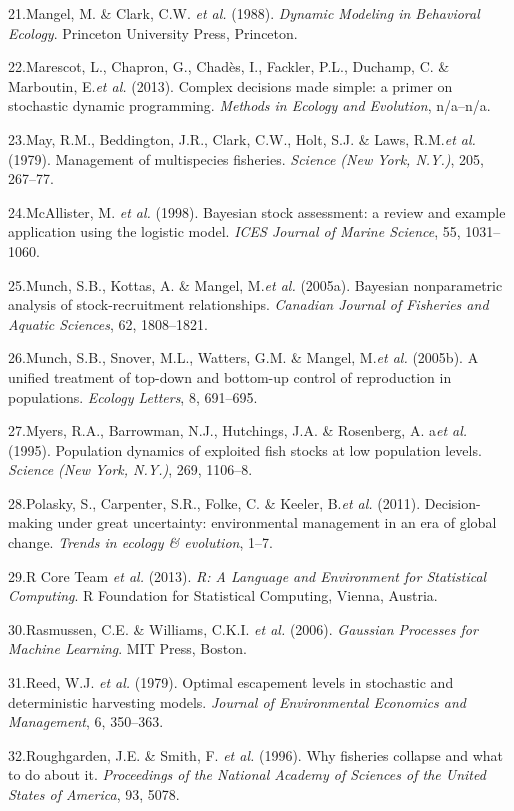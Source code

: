 \documentclass[author-year, 12pt,review]{elsarticle} %
\begin{document}
21.Mangel, M. \& Clark, C.W. \emph{et al.} (1988). \emph{Dynamic
Modeling in Behavioral Ecology}. Princeton University Press, Princeton.

22.Marescot, L., Chapron, G., Chadès, I., Fackler, P.L., Duchamp, C. \&
Marboutin, E.\emph{et al.} (2013). Complex decisions made simple: a
primer on stochastic dynamic programming. \emph{Methods in Ecology and
Evolution}, n/a--n/a.

23.May, R.M., Beddington, J.R., Clark, C.W., Holt, S.J. \& Laws,
R.M.\emph{et al.} (1979). Management of multispecies fisheries.
\emph{Science (New York, N.Y.)}, 205, 267--77.

24.McAllister, M. \emph{et al.} (1998). Bayesian stock assessment: a
review and example application using the logistic model. \emph{ICES
Journal of Marine Science}, 55, 1031--1060.

25.Munch, S.B., Kottas, A. \& Mangel, M.\emph{et al.} (2005a). Bayesian
nonparametric analysis of stock-recruitment relationships.
\emph{Canadian Journal of Fisheries and Aquatic Sciences}, 62,
1808--1821.

26.Munch, S.B., Snover, M.L., Watters, G.M. \& Mangel, M.\emph{et al.}
(2005b). A unified treatment of top-down and bottom-up control of
reproduction in populations. \emph{Ecology Letters}, 8, 691--695.

27.Myers, R.A., Barrowman, N.J., Hutchings, J.A. \& Rosenberg, A.
a\emph{et al.} (1995). Population dynamics of exploited fish stocks at
low population levels. \emph{Science (New York, N.Y.)}, 269, 1106--8.

28.Polasky, S., Carpenter, S.R., Folke, C. \& Keeler, B.\emph{et al.}
(2011). Decision-making under great uncertainty: environmental
management in an era of global change. \emph{Trends in ecology \&
evolution}, 1--7.

29.R Core Team \emph{et al.} (2013). \emph{R: A Language and Environment
for Statistical Computing}. R Foundation for Statistical Computing,
Vienna, Austria.

30.Rasmussen, C.E. \& Williams, C.K.I. \emph{et al.} (2006).
\emph{Gaussian Processes for Machine Learning}. MIT Press, Boston.

31.Reed, W.J. \emph{et al.} (1979). Optimal escapement levels in
stochastic and deterministic harvesting models. \emph{Journal of
Environmental Economics and Management}, 6, 350--363.

32.Roughgarden, J.E. \& Smith, F. \emph{et al.} (1996). Why fisheries
collapse and what to do about it. \emph{Proceedings of the National
Academy of Sciences of the United States of America}, 93, 5078.
\end{document}

